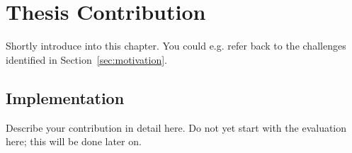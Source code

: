 \chapter{Thesis Contribution}
\label{cha:thesis_contribution}
Shortly introduce into this chapter.
You could e.g. refer back to the challenges identified in Section~\ref{sec:motivation}.

\section{Implementation}
\label{sec:implementation}
Describe your contribution in detail here.
Do not yet start with the evaluation here; this will be done later on.
